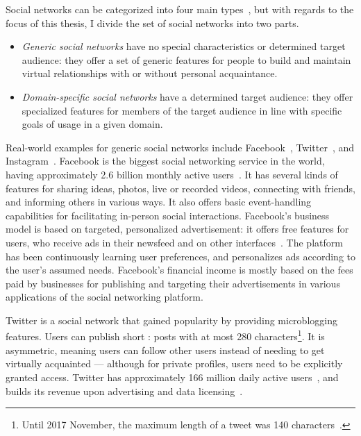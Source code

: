 Social networks can be categorized into four main types~\cite{thelwall2009}, but with regards to the focus of this thesis, I divide the set of social networks into two parts.

\begin{itemize}
\item \emph{Generic social networks} have no special characteristics or determined target audience: they offer a set of generic features for people to build and maintain virtual relationships with or without personal acquaintance.
\item \emph{Domain-specific social networks} have a determined target audience: they offer specialized features for members of the target audience in line with specific goals of usage in a given domain.
\end{itemize}

Real-world examples for generic social networks include Facebook~\cite{aboutfacebook}, Twitter~\cite{abouttwitter}, and Instagram~\cite{aboutinstagram}. Facebook is the biggest social networking service in the world, having approximately 2.6 billion monthly active users~\cite{facebook2020q1report}. It has several kinds of features for sharing ideas, photos, live or recorded videos, connecting with friends, and informing others in various ways. It also offers basic event-handling capabilities for facilitating in-person social interactions. Facebook's business model is based on targeted, personalized advertisement: it offers free features for users, who receive ads in their newsfeed and on other interfaces~\cite{fb-business-model}. The platform has been continuously learning user preferences, and personalizes ads according to the user's assumed needs. Facebook's financial income is mostly based on the fees paid by businesses for publishing and targeting their advertisements in various applications of the social networking platform.

Twitter is a social network that gained popularity by providing microblogging features. Users can publish short : posts with at most 280 characters\footnote{Until 2017 November, the maximum length of a tweet was 140 characters~\cite{twitter-doubling-character-limit}.}. It is asymmetric, meaning users can follow other users instead of needing to get virtually acquainted — although for private profiles, users need to be explicitly granted access. Twitter has approximately 166 million daily active users~\cite{twitter2020q1report}, and builds its revenue upon advertising and data licensing~\cite{twitter-business-model}.

